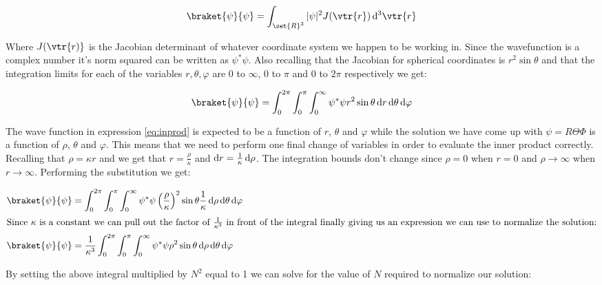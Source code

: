 \documentclass{article}
\begin{document}
    \begin{equation}
        \braket{\psi}{\psi} = \int_{\set{R}^3}|\psi|^2 J(\vtr{r})\odif[order=3]{\vtr{r}}
    \end{equation}

    Where $J(\vtr{r)}$ is the Jacobian determinant of whatever coordinate system we happen to be working in. Since the wavefunction is a complex number it's norm squared can be written as $\psi^{\ast}\psi$.
    Also recalling that the Jacobian for spherical coordinates is $r^2 \sin\theta$ and that the integration limits for each of the variables $r, \theta, \varphi$ are 0 to $\infty$, 0 to $\pi$ and 
    0 to $2\pi$ respectively we get:

    \begin{equation}
        \label{eq:inprod}
        \braket{\psi}{\psi} = \int_{0}^{2\pi}\int_{0}^{\pi}\int_{0}^{\infty}\psi^{\ast}\psi r^2 \sin\theta \odif{r, \theta, \varphi}        
    \end{equation}

    The wave function in expression \ref{eq:inprod} is expected to be a function of $r$, $\theta$ and $\varphi$ while the solution we have come up with $\psi = R\Theta\Phi$ is a function of
    $\rho$, $\theta$ and $\varphi$. This means that we need to perform one final change of variables in order to evaluate the inner product correctly. Recalling that $\rho = \kappa r$ and
    we get that $r = \frac{\rho}{\kappa}$ and $\odif{r} = \frac{1}{\kappa}\odif{\rho}$. The integration bounds don't change since $\rho = 0$ when $r = 0$ and $\rho \to \infty$ when $r \to \infty$.
    Performing the substitution we get:

    \begin{align}
        \braket{\psi}{\psi} &= \int_{0}^{2\pi}\int_{0}^{\pi}\int_{0}^{\infty}\psi^{\ast}\psi \left( \frac{\rho}{\kappa} \right)^2 \sin\theta \frac{1}{\kappa}\odif{\rho, \theta, \varphi} \\
        \intertext{Since $\kappa$ is a constant we can pull out the factor of $\frac{1}{\kappa^3}$ in front of the integral finally giving us an expression we can use to normalize the solution:}
        \braket{\psi}{\psi} &= \frac{1}{\kappa^3}\int_{0}^{2\pi}\int_{0}^{\pi}\int_{0}^{\infty}\psi^{\ast}\psi \rho^2 \sin\theta \odif{\rho, \theta, \varphi}
    \end{align}

    By setting the above integral multiplied by $N^2$ equal to 1 we can solve for the value of $N$ required to normalize our solution:
\end{document}
